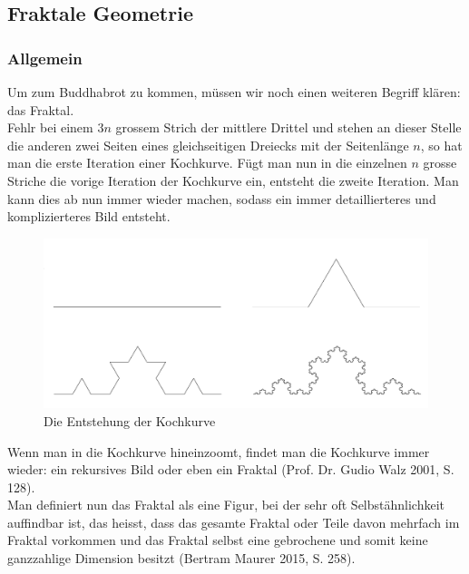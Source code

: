 \subsection{Fraktale Geometrie}
\subsubsection{Allgemein}
Um zum Buddhabrot zu kommen, müssen wir noch einen weiteren Begriff klären: das Fraktal.\\ Fehlr bei einem 3$n$ grossem Strich der mittlere Drittel und stehen an dieser Stelle die anderen zwei Seiten eines gleichseitigen Dreiecks mit der Seitenlänge $n$, so hat man die erste Iteration einer Kochkurve. Fügt man nun in die einzelnen $n$ grosse Striche die vorige Iteration der Kochkurve ein, entsteht die zweite Iteration. Man kann dies ab nun immer wieder machen, sodass ein immer detaillierteres und komplizierteres Bild entsteht.\\
\begin{figure}[h]
    \centering
    \includegraphics[width=.5\textwidth]{Pictures/Kochkurve.png}
    \caption{Die Entstehung der Kochkurve}
    \label{fig:Kochkurve}
\end{figure}
Wenn man in die Kochkurve hineinzoomt, findet man die Kochkurve immer wieder: ein rekursives Bild oder eben ein Fraktal (Prof. Dr. Gudio Walz 2001, S. 128).\\Man definiert nun das Fraktal als eine Figur, bei der sehr oft Selbstähnlichkeit auffindbar ist, das heisst, dass das gesamte Fraktal oder Teile davon mehrfach im Fraktal vorkommen und das Fraktal selbst eine gebrochene und somit keine ganzzahlige Dimension besitzt (Bertram Maurer 2015, S. 258).\\

